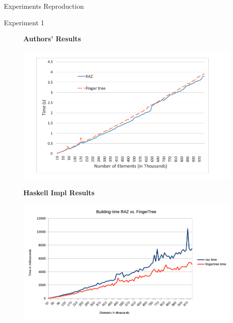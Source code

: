 \documentclass{beamer}
\begin{document}
\begin{frame}[fragile]{Experiments Reproduction}

  \begin{block}{Experiment 1}
  \begin{figure}[!tbp]
  \centering
  \textbf{Authors' Results}\par\medskip
   \begin{minipage}[b]{0.4\textwidth}
     \begin{center}
      \includegraphics[width=\textwidth]{author_exp_1}
     \end{center}
  \end{minipage}

   \textbf{Haskell Impl Results}\par\medskip
    \begin{minipage}[b]{0.4\textwidth}
     \begin{center}
      \includegraphics[width=\textwidth]{raz_ftree_exp_1}
     \end{center}
   \end{minipage}

 \end{figure}
  \end{block}

\end{frame}
\end{document}
